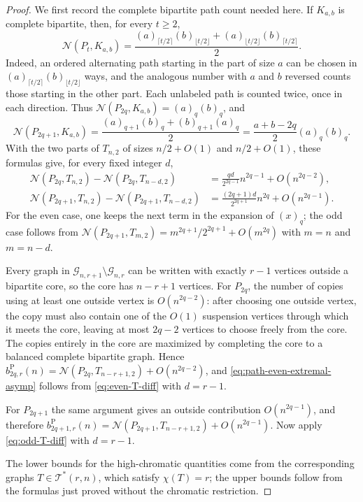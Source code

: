 \documentclass[11pt]{article}
\theoremstyle{definition}
\theoremstyle{plain}
\theoremstyle{remark}
\theoremstyle{plain}
\numberwithin{equation}{section}
\newcommand{\cG}{\mathcal G}
\newcommand{\cT}{\mathcal T}
\newcommand{\N}{\mathcal N}
\begin{document}
\begin{proof}
We first record the complete bipartite path count needed here. If $K_{a,b}$ is complete bipartite, then, for every $t\ge2$,
\[
        \N(P_t,K_{a,b})
        =\frac{(a)_{\lceil t/2\rceil}(b)_{\lfloor t/2\rfloor}
        +(a)_{\lfloor t/2\rfloor}(b)_{\lceil t/2\rceil}}{2}.
\]
Indeed, an ordered alternating path starting in the part of size $a$ can be chosen in $(a)_{\lceil t/2\rceil}(b)_{\lfloor t/2\rfloor}$ ways, and the analogous number with $a$ and $b$ reversed counts those starting in the other part. Each unlabeled path is counted twice, once in each direction. Thus $\N(P_{2q},K_{a,b})=(a)_q(b)_q$, and
\[
        \N(P_{2q+1},K_{a,b})
        =\frac{(a)_{q+1}(b)_q+(b)_{q+1}(a)_q}{2}
        =\frac{a+b-2q}{2}(a)_q(b)_q.
\]
With the two parts of $T_{n,2}$ of sizes $n/2+O(1)$ and $n/2+O(1)$, these formulas give, for every fixed integer $d$,
\begin{align}
        \N(P_{2q},T_{n,2})-\N(P_{2q},T_{n-d,2})&=\frac{qd}{2^{2q-1}}n^{2q-1}+O(n^{2q-2}),\label{eq:even-T-diff}\\
        \N(P_{2q+1},T_{n,2})-\N(P_{2q+1},T_{n-d,2})&=\frac{(2q+1)d}{2^{2q+1}}n^{2q}+O(n^{2q-1}).\label{eq:odd-T-diff}
\end{align}
For the even case, one keeps the next term in the expansion of $(x)_q$; the odd case follows from $\N(P_{2q+1},T_{m,2})=m^{2q+1}/2^{2q+1}+O(m^{2q})$ with $m=n$ and $m=n-d$.

Every graph in $\cG_{n,r+1}\setminus\cG_{n,r}$ can be written with exactly $r-1$ vertices outside a bipartite core, so the core has $n-r+1$ vertices. For $P_{2q}$, the number of copies using at least one outside vertex is $O(n^{2q-2})$: after choosing one outside vertex, the copy must also contain one of the $O(1)$ suspension vertices through which it meets the core, leaving at most $2q-2$ vertices to choose freely from the core. The copies entirely in the core are maximized by completing the core to a balanced complete bipartite graph. Hence $b^{\mathrm P}_{2q,r}(n)=\N(P_{2q},T_{n-r+1,2})+O(n^{2q-2})$, and \eqref{eq:path-even-extremal-asymp} follows from \eqref{eq:even-T-diff} with $d=r-1$.

For $P_{2q+1}$ the same argument gives an outside contribution $O(n^{2q-1})$, and therefore $b^{\mathrm P}_{2q+1,r}(n)=\N(P_{2q+1},T_{n-r+1,2})+O(n^{2q-1})$. Now apply \eqref{eq:odd-T-diff} with $d=r-1$.

The lower bounds for the high-chromatic quantities come from the corresponding graphs $T\in\cT^*(r,n)$, which satisfy $\chi(T)=r$; the upper bounds follow from the formulas just proved without the chromatic restriction.
\end{proof}
\end{document}
